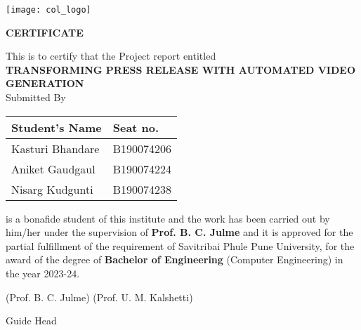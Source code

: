 \documentclass[12pt]{article}
\begin{document}
\pagebreak{}
\noindent \begin{center}


\noindent \texttt{[image: col\_logo]}

\bigskip
\fontsize{14}{14}\textbf{CERTIFICATE }
\smallskip

\noindent \justify
\begin{center}
   \vspace{5mm} This is to certify that the Project report entitled\\
    \vspace{5mm}
\fontsize{12}{12}\textbf{TRANSFORMING PRESS RELEASE WITH AUTOMATED VIDEO GENERATION}\\

\vspace{5mm}
Submitted By\\
\vspace{5mm}
\begin{tabular}{|l|l|}
\hline
Student's Name       & Seat no. \\
\hline
Kasturi Bhandare    & B190074206 \\
\hline
Aniket Gaudgaul      & B190074224 \\
\hline
Nisarg Kudgunti & B190074238 \\
\hline

\hline
\end{tabular}

\end{center}
\medskip
\medskip
is a bonafide student of this institute and the work has been carried out by him/her under the supervision of  \textbf{Prof. B. C. Julme} and it is approved for the partial fulfillment of the requirement of Savitribai Phule Pune University, for the award of the degree of \textbf{Bachelor of Engineering} (Computer Engineering) in the year 2023-24. 

\bigskip

\noindent
\medskip
\bigskip
\begin{flushleft} \hspace{40pt}  (Prof. B. C. Julme)  \hspace{135pt}  (Prof. U. M. Kalshetti) \end{flushleft}

\begin{flushleft} \hspace{70pt}  Guide  \hspace{205pt}  Head \end{flushleft}


\end{center}
\end{document}

